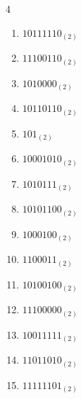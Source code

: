 \begin{multicols}{4}
\begin{enumerate}
        \phantom{$=26$}

  \item $10111110_{(2)}$

        \phantom{$=190$}

\columnbreak %

  \item $11100110_{(2)}$

        \phantom{$=230$}

  \item $1010000_{(2)}$

        \phantom{$=80$}

  \item $10110110_{(2)}$

        \phantom{$=182$}

  \item $101_{(2)}$

        \phantom{$=5$}

  \item $10001010_{(2)}$

        \phantom{$=138$}

  \item $1010111_{(2)}$

        \phantom{$=87$}

  \item $10101100_{(2)}$

        \phantom{$=172$}

  \item $1000100_{(2)}$

        \phantom{$=68$}

  \item $1100011_{(2)}$

        \phantom{$=99$}

  \item $10100100_{(2)}$

        \phantom{$=164$}

  \item $11100000_{(2)}$

        \phantom{$=224$}

  \item $10011111_{(2)}$

        \phantom{$=159$}

  \item $11011010_{(2)}$

        \phantom{$=218$}

  \item $11111101_{(2)}$


\end{enumerate}
\end{multicols}
